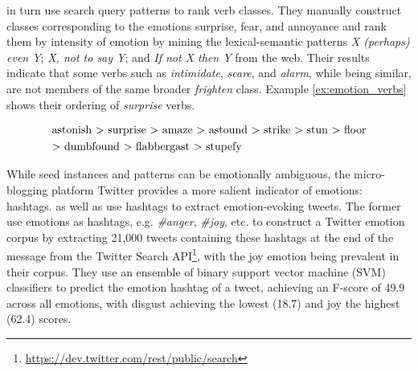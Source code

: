 \citeauthor{emotion_verbs} in turn use search query patterns to rank verb classes. They manually construct classes corresponding to the emotions surprise, fear, and annoyance and rank them by intensity of emotion by mining the lexical-semantic patterns \textit{X (perhaps) even Y}; \textit{X, not to say Y}; and \textit{If not X then Y} from the web. Their results indicate that some verbs such as \textit{intimidate}, \textit{scare}, and \textit{alarm}, while being similar, are not members of the same broader \textit{frighten} class. Example \ref{ex:emotion_verbs} shows their ordering of \textit{surprise} verbs.

\begin{align}
\begin{split}\label{ex:emotion_verbs}
&\textnormal{astonish > surprise > amaze > astound > strike > stun > floor}\\
&\textnormal{> dumbfound > flabbergast > stupefy}
\end{split}
\end{align}

While seed instances and patterns can be emotionally ambiguous, the micro-blogging platform Twitter provides a more salient indicator of emotions: hashtags. \citeauthor{twitter_hashtags_nrc} as well as \citeauthor{twitter_hashtags_bootstrapping} use hashtags to extract emotion-evoking tweets. The former use emotions as hashtags, e.g. \textit{\#anger}, \textit{\#joy}, etc. to construct a Twitter emotion corpus by extracting 21,000 tweets containing these hashtags at the end of the message from the Twitter Search API\footnote{\url{https://dev.twitter.com/rest/public/search}}, with the joy emotion being prevalent in their corpus. They use an ensemble of binary support vector machine (SVM) classifiers to predict the emotion hashtag of a tweet, achieving an F-score of 49.9 across all emotions, with disgust achieving the lowest (18.7) and joy the highest (62.4) scores.

